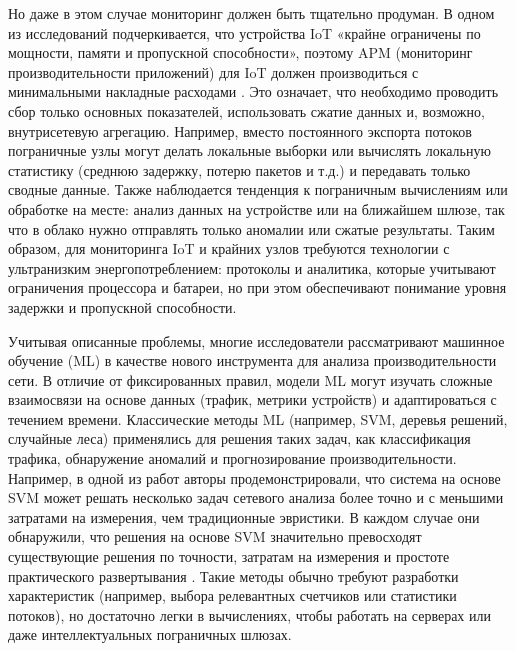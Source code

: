 Но даже в этом случае мониторинг должен быть тщательно продуман. В одном из исследований подчеркивается, что устройства IoT «крайне ограничены по мощности, памяти и пропускной способности», поэтому APM (мониторинг производительности приложений) для IoT должен производиться с минимальными накладные расходами \cite{GRAF2024989}. Это означает, что необходимо проводить сбор только основных показателей, использовать сжатие данных и, возможно, внутрисетевую агрегацию. Например, вместо постоянного экспорта потоков пограничные узлы могут делать локальные выборки или вычислять локальную статистику (среднюю задержку, потерю пакетов и т.д.) и передавать только сводные данные. Также наблюдается тенденция к пограничным вычислениям или обработке на месте: анализ данных на устройстве или на ближайшем шлюзе, так что в облако нужно отправлять только аномалии или сжатые результаты. Таким образом, для мониторинга IoT и крайних узлов требуются технологии с ультранизким энергопотреблением: протоколы и аналитика, которые учитывают ограничения процессора и батареи, но при этом обеспечивают понимание уровня задержки и пропускной способности.

Учитывая описанные проблемы, многие исследователи рассматривают машинное обучение (ML) в качестве нового инструмента для анализа производительности сети. В отличие от фиксированных правил, модели ML могут изучать сложные взаимосвязи на основе данных (трафик, метрики устройств) и адаптироваться с течением времени. Классические методы ML (например, SVM, деревья решений, случайные леса) применялись для решения таких задач, как классификация трафика, обнаружение аномалий и прогнозирование производительности. Например, в одной из работ авторы продемонстрировали, что система на основе SVM может решать несколько задач сетевого анализа более точно и с меньшими затратами на измерения, чем традиционные эвристики. В каждом случае они обнаружили, что решения на основе SVM значительно превосходят существующие решения по точности, затратам на измерения и простоте практического развертывания \cite{Mirza2012}. Такие методы обычно требуют разработки характеристик (например, выбора релевантных счетчиков или статистики потоков), но достаточно легки в вычислениях, чтобы работать на серверах или даже интеллектуальных пограничных шлюзах.

